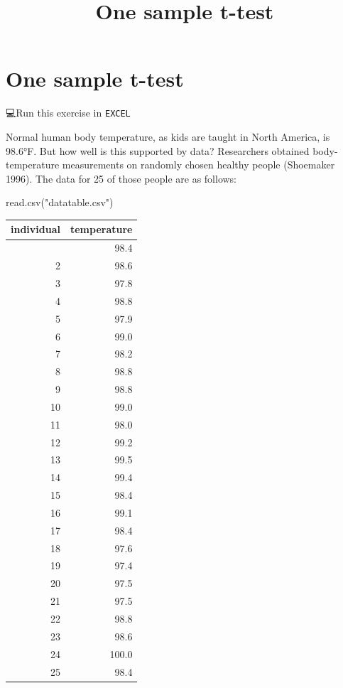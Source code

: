 \documentclass[
  letterpaper,
  DIV=11,
  numbers=noendperiod]{scrartcl}
\title{One sample t-test}
\author{}
\date{}
\newenvironment{Shaded}{\begin{snugshade}}{\end{snugshade}}
\newcommand{\FunctionTok}[1]{\textcolor[rgb]{0.28,0.35,0.67}{#1}}
\newcommand{\NormalTok}[1]{\textcolor[rgb]{0.00,0.23,0.31}{#1}}
\newcommand{\StringTok}[1]{\textcolor[rgb]{0.13,0.47,0.30}{#1}}
\begin{document}
\maketitle


\section{One sample t-test}\label{one-sample-t-test}

💻Run this exercise in \texttt{EXCEL}

Normal human body temperature, as kids are taught in North America, is
98.6°F. But how well is this supported by data? Researchers obtained
body-temperature measurements on randomly chosen healthy people
(Shoemaker 1996). The data for 25 of those people are as follows:

\begin{Shaded}
\begin{Highlighting}[]
\FunctionTok{read.csv}\NormalTok{(}\StringTok{"datatable.csv"}\NormalTok{)}
\end{Highlighting}
\end{Shaded}

\begin{longtable}[]{@{}rr@{}}
\toprule\noalign{}
individual & temperature \\
\midrule\noalign{}
\endhead
\bottomrule\noalign{}
\endlastfoot
1 & 98.4 \\
2 & 98.6 \\
3 & 97.8 \\
4 & 98.8 \\
5 & 97.9 \\
6 & 99.0 \\
7 & 98.2 \\
8 & 98.8 \\
9 & 98.8 \\
10 & 99.0 \\
11 & 98.0 \\
12 & 99.2 \\
13 & 99.5 \\
14 & 99.4 \\
15 & 98.4 \\
16 & 99.1 \\
17 & 98.4 \\
18 & 97.6 \\
19 & 97.4 \\
20 & 97.5 \\
21 & 97.5 \\
22 & 98.8 \\
23 & 98.6 \\
24 & 100.0 \\
25 & 98.4 \\
\end{longtable}
\end{document}
